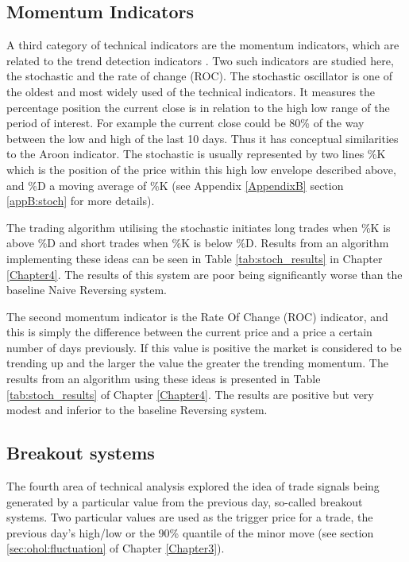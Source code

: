 \subsection{Momentum Indicators}
A third category of technical indicators are the momentum indicators, which are related to the trend detection indicators \citep{Menkhoff2012660}. Two such indicators are studied here, the stochastic and the rate of change (ROC). The stochastic oscillator is one of the oldest and most widely used of the technical indicators. It measures the percentage position the current close is in relation to the high low range of the period of interest. For example the current close could be 80\% of the way between the low and high of the last 10 days. Thus it has conceptual similarities to the Aroon indicator. The stochastic is usually represented by two lines \%K which is the position of the price within this high low envelope described above, and \%D a moving average of \%K (see Appendix \ref{AppendixB} section \ref{appB:stoch} for more details). 

The trading algorithm utilising the stochastic initiates long trades when \%K is above \%D and short trades when \%K is below \%D. Results from an algorithm implementing these ideas can be seen in  Table \ref{tab:stoch_results} in Chapter \ref{Chapter4}. The results of this system are poor being significantly worse than the baseline Naive Reversing system. 


The second momentum indicator is the Rate Of Change (ROC) indicator, and this is simply the difference between the current price and a price a certain number of days previously. If this value is positive the market is considered to be trending up and the larger the value the greater the trending momentum. The results from an algorithm using these ideas is presented in Table \ref{tab:stoch_results} of Chapter \ref{Chapter4}. The results are positive but very modest and inferior to the baseline Reversing system.

\subsection{Breakout systems}
The fourth area of technical analysis explored the idea of trade signals being generated by a particular value from the previous day, so-called breakout systems. Two particular values are used as the trigger price for a trade, the previous day's high/low or the 90\% quantile of the minor move (see section \ref{sec:ohol:fluctuation} of Chapter \ref{Chapter3}). 

